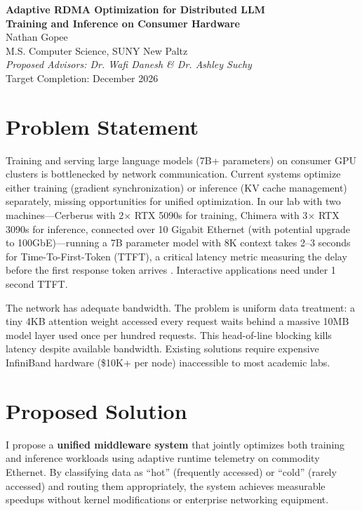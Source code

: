 \documentclass[10pt,letterpaper]{article}
\begin{document}
\begin{center}
{\LARGE \textbf{Adaptive RDMA Optimization for Distributed LLM\\Training and Inference on Consumer Hardware}}\\[8pt]
{\large Nathan Gopee}\\
M.S. Computer Science, SUNY New Paltz\\
\textit{Proposed Advisors: Dr. Wafi Danesh \& Dr. Ashley Suchy}\\
Target Completion: December 2026
\end{center}

\section{Problem Statement}

Training and serving large language models (7B+ parameters) on consumer GPU clusters is bottlenecked by network communication. Current systems optimize either training (gradient synchronization) or inference (KV cache management) separately, missing opportunities for unified optimization. In our lab with two machines---Cerberus with 2$\times$ RTX 5090s for training, Chimera with 3$\times$ RTX 3090s for inference, connected over 10 Gigabit Ethernet (with potential upgrade to 100GbE)---running a 7B parameter model with 8K context takes 2--3 seconds for Time-To-First-Token (TTFT), a critical latency metric measuring the delay before the first response token arrives \cite{nvidia-nim}. Interactive applications need under 1 second TTFT.

The network has adequate bandwidth. The problem is uniform data treatment: a tiny 4KB attention weight accessed every request waits behind a massive 10MB model layer used once per hundred requests. This head-of-line blocking kills latency despite available bandwidth. Existing solutions require expensive InfiniBand hardware (\$10K+ per node) inaccessible to most academic labs.

\section{Proposed Solution}

I propose a \textbf{unified middleware system} that jointly optimizes both training and inference workloads using adaptive runtime telemetry on commodity Ethernet. By classifying data as ``hot'' (frequently accessed) or ``cold'' (rarely accessed) and routing them appropriately, the system achieves measurable speedups without kernel modifications or enterprise networking equipment.
\end{document}
